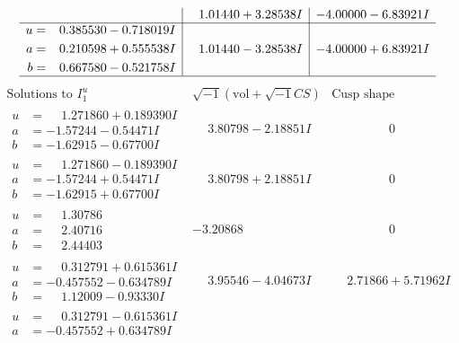 \documentclass[1p]{elsarticle_modified}
\theoremstyle{definition}
\newcommand{\I}{\sqrt{-1}}
\begin{document}
$$\begin{array}{c|c|c}
 & \phantom{-}1.01440 + 3.28538 I & -4.00000 - 6.83921 I \\ \hline\begin{aligned}
u &= \phantom{-}0.385530 - 0.718019 I \\
a &= \phantom{-}0.210598 + 0.555538 I \\
b &= \phantom{-}0.667580 - 0.521758 I\end{aligned}
 & \phantom{-}1.01440 - 3.28538 I & -4.00000 + 6.83921 I\\
 \hline 
 \end{array}$$\newpage$$\begin{array}{c|c|c}  
\text{Solutions to }I^u_{1}& \I (\text{vol} + \sqrt{-1}CS) & \text{Cusp shape}\\
 \hline 
\begin{aligned}
u &= \phantom{-}1.271860 + 0.189390 I \\
a &= -1.57244 - 0.54471 I \\
b &= -1.62915 - 0.67700 I\end{aligned}
 & \phantom{-}3.80798 - 2.18851 I & \phantom{-0.000000 } 0 \\ \hline\begin{aligned}
u &= \phantom{-}1.271860 - 0.189390 I \\
a &= -1.57244 + 0.54471 I \\
b &= -1.62915 + 0.67700 I\end{aligned}
 & \phantom{-}3.80798 + 2.18851 I & \phantom{-0.000000 } 0 \\ \hline\begin{aligned}
u &= \phantom{-}1.30786\phantom{ +0.000000I} \\
a &= \phantom{-}2.40716\phantom{ +0.000000I} \\
b &= \phantom{-}2.44403\phantom{ +0.000000I}\end{aligned}
 & -3.20868\phantom{ +0.000000I} & \phantom{-0.000000 } 0 \\ \hline\begin{aligned}
u &= \phantom{-}0.312791 + 0.615361 I \\
a &= -0.457552 - 0.634789 I \\
b &= \phantom{-}1.12009 - 0.93330 I\end{aligned}
 & \phantom{-}3.95546 - 4.04673 I & \phantom{-}2.71866 + 5.71962 I \\ \hline\begin{aligned}
u &= \phantom{-}0.312791 - 0.615361 I \\
a &= -0.457552 + 0.634789 I \\

\end{aligned}
\end{array}$$
\end{document}
